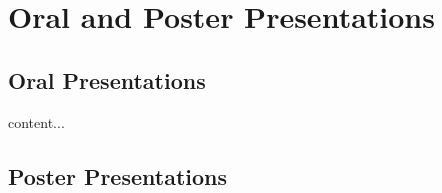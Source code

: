 \chapter{Oral and Poster Presentations}

\section{Oral Presentations}

\begin{flushleft}
	content...
\end{flushleft}

\section{Poster Presentations}